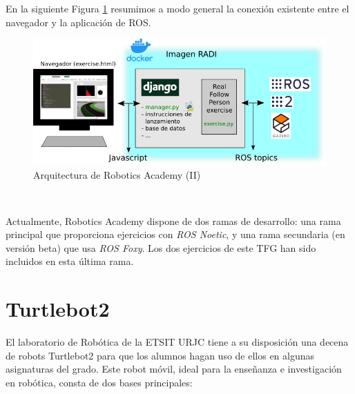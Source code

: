 En la siguiente Figura \ref{fig:infraestructura_robotics_academy} resumimos a modo general la conexión existente entre el navegador y la aplicación de ROS.

\begin{figure} [H]
  \begin{center}
    \includegraphics[width=15cm]{imagenes/cap3/esquema-robotics-academy.png}
  \end{center}
  \caption{Arquitectura de Robotics Academy (II)}
  \label{fig:infraestructura_robotics_academy}
\end{figure}\

Actualmente, Robotics Academy dispone de dos ramas de desarrollo: una rama principal que proporciona ejercicios con \textit{ROS Noetic}, y una rama secundaria (en versión beta) que usa \textit{ROS Foxy}. Los dos ejercicios de este TFG han sido incluidos en esta última rama. 


\section{Turtlebot2}
\label{sec:turtlebot2}

El laboratorio de Robótica de la ETSIT URJC tiene a su disposición una decena de robots Turtlebot2 para que los alumnos hagan uso de ellos en algunas asignaturas del grado. Este robot móvil, ideal para la enseñanza e investigación en robótica, consta de dos bases principales:\\

